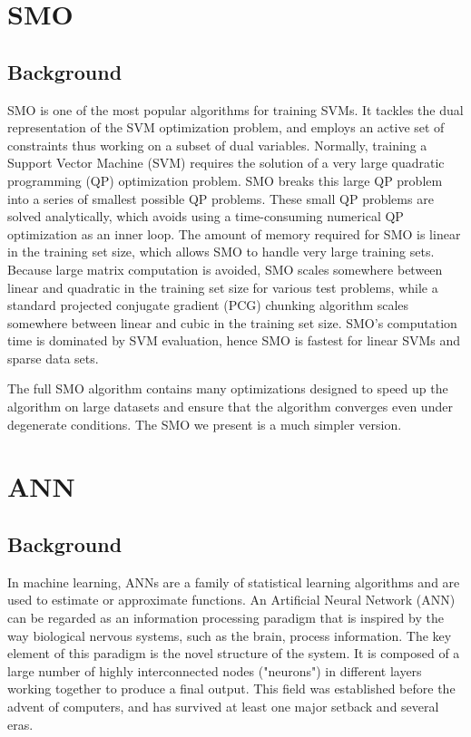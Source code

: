 \documentclass[11pt,letterpaper]{article}
\begin{document}
\section{SMO}

\subsection{Background}

SMO is one of the most popular algorithms for training SVMs. It tackles the dual representation of the SVM optimization problem, and employs an active set of constraints thus working on a subset of dual variables. Normally, training a Support Vector Machine (SVM) requires the solution of a very large quadratic programming (QP) optimization problem. SMO breaks this large QP problem into a series of smallest possible QP problems. These small QP problems are solved analytically, which avoids using a time-consuming numerical QP optimization as an inner loop. The amount of memory required for SMO is linear in the training set size, which allows SMO to handle very large training sets. Because large matrix computation is avoided, SMO scales somewhere between linear and quadratic in the training set size for various test problems, while a standard projected conjugate gradient (PCG) chunking algorithm scales somewhere between linear and cubic in the training set size. SMO's computation time is dominated by SVM evaluation, hence SMO is fastest for linear SVMs and sparse data sets.

The full SMO algorithm contains many optimizations designed to speed up the algorithm on large datasets and ensure that the algorithm converges even under degenerate conditions. The SMO we present is a much simpler version.

\section{ANN}

\subsection{Background}

In machine learning, ANNs are a family of statistical learning algorithms and are used to estimate or approximate functions. An Artificial Neural Network (ANN) can be regarded as an information processing paradigm that is inspired by the way biological nervous systems, such as the brain, process information.  The key element of this paradigm is the novel structure of the system. It is composed of a large number of highly interconnected nodes ("neurons") in different layers working together to produce a final output.  This field was established before the advent of computers, and has survived at least one major setback and several eras.
\end{document}
